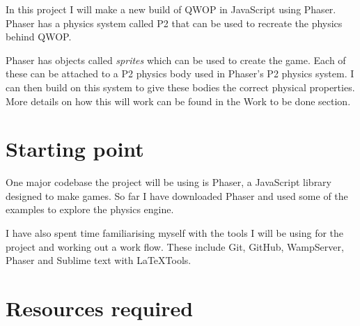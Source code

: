 \documentclass[12pt,a4paper,twoside]{article}
\begin{document}

In this project I will make a new build of QWOP in JavaScript using Phaser. Phaser has a physics system called P2 that can be used to recreate the physics behind QWOP.

Phaser has objects called \emph{sprites} which can be used to create the game. Each of these can be attached to a P2 physics body used in Phaser's P2 physics system. I can then build on this system to give these bodies the correct physical properties.
More details on how this will work can be found in the Work to be done section.


 

\section*{Starting point}


One major codebase the project will be using is Phaser, a JavaScript library designed to make games.
So far I have downloaded Phaser and used some of the examples to explore the physics engine.

I have also spent time familiarising myself with the tools I will be using for the project and working out a work flow. These include Git, GitHub, WampServer, Phaser and Sublime text with LaTeXTools.

\section*{Resources required}
\end{document}
